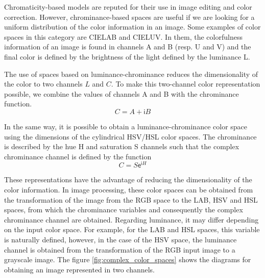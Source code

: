 Chromaticity-based models are reputed for their use in image editing and color correction. However, chrominance-based spaces are useful if we are looking for a uniform distribution of the color information in an image. Some examples of color spaces in this category are CIELAB and CIELUV. In them, the colorfulness information of an image is found in channels A and B (resp. U and V) and the final color is defined by the brightness of the light defined by the luminance L.

The use of spaces based on luminance-chrominance reduces the dimensionality of the color to two channels $L$ and $C$. To make this two-channel color representation possible, we combine the values of channels A and B with the chrominance function.
\begin{equation}\label{eq:chrominance_lab}
    C = A + \mathsf{i}B
\end{equation}

In the same way, it is possible to obtain a luminance-chrominance color space using the dimensions of the cylindrical HSV/HSL color spaces. The chrominance is described by the hue H and saturation S channels such that the complex chrominance channel is defined by the function
\begin{equation}\label{eq:chrominance_hsv}
    C = S \mathsf{e}^{\mathsf{i}H}
\end{equation}

These representations have the advantage of reducing the dimensionality of the color information. In image processing, these color spaces can be obtained from the transformation of the image from the RGB space to the LAB, HSV and HSL spaces, from which the chrominance variables and consequently the complex chrominance channel are obtained. Regarding luminance, it may differ depending on the input color space. For example, for the LAB and HSL spaces, this variable is naturally defined, however, in the case of the HSV space, the luminance channel is obtained from the transformation of the RGB input image to a grayscale image. The figure \ref{fig:complex_color_spaces} shows the diagrams for obtaining an image represented in two channels.


